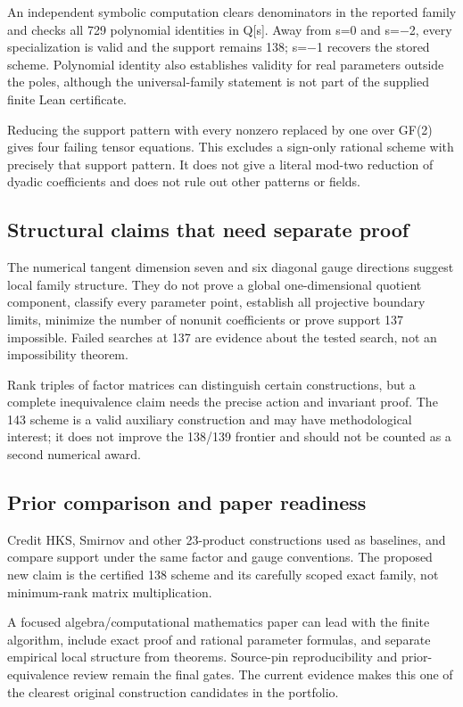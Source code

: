 \documentclass[11pt,a4paper]{article}
\begin{document}
An independent symbolic computation clears denominators in the reported family and checks all 729 polynomial identities in Q[s]. Away from s=0 and s=\ensuremath{-}2, every specialization is valid and the support remains 138; s=\ensuremath{-}1 recovers the stored scheme. Polynomial identity also establishes validity for real parameters outside the poles, although the universal-family statement is not part of the supplied finite Lean certificate.

Reducing the support pattern with every nonzero replaced by one over GF(2) gives four failing tensor equations. This excludes a sign-only rational scheme with precisely that support pattern. It does not give a literal mod-two reduction of dyadic coefficients and does not rule out other patterns or fields.

\subsection{Structural claims that need separate proof}
The numerical tangent dimension seven and six diagonal gauge directions suggest local family structure. They do not prove a global one-dimensional quotient component, classify every parameter point, establish all projective boundary limits, minimize the number of nonunit coefficients or prove support 137 impossible. Failed searches at 137 are evidence about the tested search, not an impossibility theorem.

Rank triples of factor matrices can distinguish certain constructions, but a complete inequivalence claim needs the precise action and invariant proof. The 143 scheme is a valid auxiliary construction and may have methodological interest; it does not improve the 138/139 frontier and should not be counted as a second numerical award.

\subsection{Prior comparison and paper readiness}
Credit HKS, Smirnov and other 23-product constructions used as baselines, and compare support under the same factor and gauge conventions. The proposed new claim is the certified 138 scheme and its carefully scoped exact family, not minimum-rank matrix multiplication.

A focused algebra/computational mathematics paper can lead with the finite algorithm, include exact proof and rational parameter formulas, and separate empirical local structure from theorems. Source-pin reproducibility and prior-equivalence review remain the final gates. The current evidence makes this one of the clearest original construction candidates in the portfolio.
\end{document}
